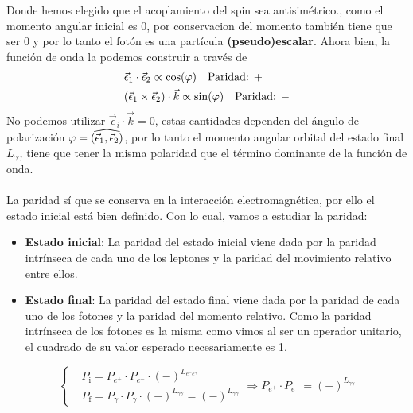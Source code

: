 Donde hemos elegido que el acoplamiento del spin sea antisimétrico., como el momento angular inicial es 0, por conservacion del momento también tiene que ser 0 y por lo tanto el fotón es una partícula \textbf{(pseudo)escalar}. Ahora bien, la función de onda la podemos construir a través de 
\begin{equation}
    \begin{aligned}
       & \vec{\epsilon}_1 \cdot \vec{\epsilon}_2 \propto \cos(\varphi) \quad \text{Paridad: } +\\
       &  \qty(\vec{\epsilon}_1 \times \vec{\epsilon}_2 ) \cdot \vec{k} \propto \sin(\varphi)\quad \text{Paridad: } -
    \end{aligned}
    \label{eq: paridad de la polarizacion}
\end{equation}
No podemos utilizar $\vec{\epsilon}_i \cdot \vec{k}=0$, estas cantidades dependen del ángulo de polarización $\varphi=\widehat{\qty(\vec{\epsilon}_1,\vec{\epsilon}_2)}$, por lo tanto el momento angular orbital del estado final $L_{\gamma \gamma}$ tiene que tener la misma polaridad que el término dominante de la función de onda.\\\\
La paridad sí que se conserva en la interacción electromagnética, por ello el estado inicial está bien definido. Con lo cual, vamos a estudiar la paridad:
\begin{itemize}
    \item \textbf{Estado inicial}: La paridad del estado inicial viene dada por la paridad intrínseca de cada uno de los leptones y la paridad del movimiento relativo entre ellos. 
    \item \textbf{Estado final}: La paridad del estado final viene dada por la paridad de cada uno de los fotones y la paridad del momento relativo. Como la paridad intrínseca de los fotones es la misma como vimos al ser un operador unitario, el cuadrado de su valor esperado necesariamente es 1.

\end{itemize}

\begin{equation*}
    \left \{ \begin{aligned}
        &P_\mathrm{i}=P_{e^+}\cdot P_{e^-} \cdot (-)^{L_{e^-e^+}} \\
        &P_\mathrm{f}=P_{\gamma}\cdot P_{\gamma} \cdot (-)^{L_{\gamma \gamma}}=(-)^{L_{\gamma \gamma}}
    \end{aligned} \right. \Rightarrow P_{e^+}\cdot P_{e^-}=(-)^{L_{\gamma \gamma}}
\end{equation*}    

